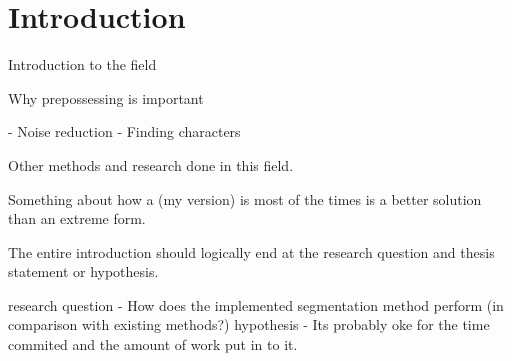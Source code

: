 \section{Introduction} %
\label{sec:introduction}



Introduction to the field

Why prepossessing is important

	- Noise reduction
	- Finding characters

Other methods and research done in this field.

Something about how a  (my version) is most of the times is a better solution than an extreme form.

The entire introduction should logically end at the research question and thesis statement or hypothesis.

	research question 	- How does the implemented segmentation method perform (in comparison with existing methods?)
	hypothesis			- Its probably oke for the time commited and the amount of work put in to it.


